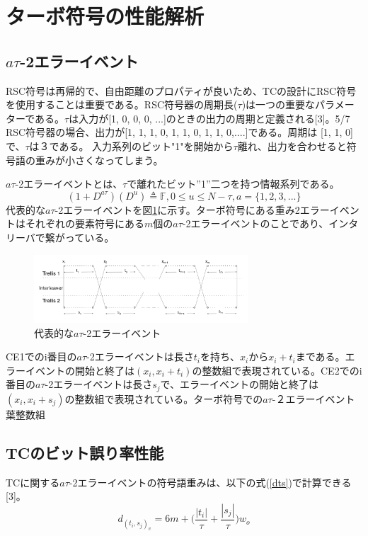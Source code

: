 \documentclass[twoside]{jarticle}
\begin{document}
\section{ターボ符号の性能解析}
\subsection{$a\tau$-2エラーイベント}
RSC符号は再帰的で、自由距離のプロパティが良いため、TCの設計にRSC符号を使用することは重要である。RSC符号器の周期長($\tau$)は一つの重要なパラメーターである。$\tau$は入力が[1, 0, 0, 0, ...]のときの出力の周期と定義される[3]。5/7 RSC符号器の場合、出力が[1, 1, 1, 0, 1, 1, 0, 1, 1, 0,....]である。周期は [1, 1, 0]で、$\tau$は３である。
入力系列のビット"1"を開始から$\tau$離れ、出力を合わせると符号語の重みが小さくなってしまう。


$a\tau$-2エラーイベントとは、$\tau$で離れたビット''1''二つを持つ情報系列である。
$$(1+D^{a\tau})(D^u)  \triangleq \mathbb{F}, 0\leq u\leq N-\tau, a=\{1,2,3,...\}$$
代表的な$a\tau$-2エラーイベントを図\ref{2m_error}に示す。ターボ符号にある重み2エラーイベントはそれぞれの要素符号にある$m$個の$a\tau$-2エラーイベントのことであり、インタリーバで繋がっている。
\begin{center}
\begin{figure}[h!]
\includegraphics[width=8cm]{weight2m.jpg}
\caption{代表的な$a\tau$-2エラーイベント}
\label{2m_error}
\end{figure}
\end{center}
\vspace{-3mm}
CE1でのi番目の$a\tau$-2エラーイベントは長さ$t_i$を持ち、$x_i$から$x_i+t_i$まである。エラーイベントの開始と終了は$(x_i,x_i+t_i)$の整数組で表現されている。CE2でのi番目の$a\tau$-2エラーイベントは長さ$s_j$で、エラーイベントの開始と終了は$(x_i,x_i+s_j)$の整数組で表現されている。ターボ符号での$a\tau$-２エラーイベント葉整数組


\subsection{TCのビット誤り率性能}
TCに関する$a\tau$-2エラーイベントの符号語重みは、以下の式(\ref{dts})で計算できる[3]。
\begin{equation}
d_{(t_i,s_j)_v}=6m+\Bigg( \frac{ \left|t_i\right|}{\tau} + \frac{ \left|s_j\right|}{\tau} \Bigg)w_o
\label{dts}
\end{equation}
\end{document}
